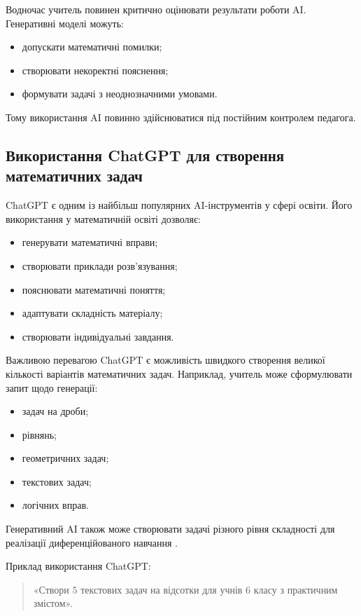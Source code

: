 Водночас учитель повинен критично оцінювати результати роботи AI. Генеративні моделі можуть:
\begin{itemize}
\item допускати математичні помилки;
\item створювати некоректні пояснення;
\item формувати задачі з неоднозначними умовами.
\end{itemize}

Тому використання AI повинно здійснюватися під постійним контролем педагога.

\subsection{Використання ChatGPT для створення математичних задач}

ChatGPT є одним із найбільш популярних AI-інструментів у сфері освіти. Його використання у математичній освіті дозволяє:
\begin{itemize}
\item генерувати математичні вправи;
\item створювати приклади розв’язування;
\item пояснювати математичні поняття;
\item адаптувати складність матеріалу;
\item створювати індивідуальні завдання.
\end{itemize}

Важливою перевагою ChatGPT є можливість швидкого створення великої кількості варіантів математичних задач. Наприклад, учитель може сформулювати запит щодо генерації:
\begin{itemize}
\item задач на дроби;
\item рівнянь;
\item геометричних задач;
\item текстових задач;
\item логічних вправ.
\end{itemize}

Генеративний AI також може створювати задачі різного рівня складності для реалізації диференційованого навчання \cite{Walkington2025}.

Приклад використання ChatGPT:
\begin{quote}
«Створи 5 текстових задач на відсотки для учнів 6 класу з практичним змістом».
\end{quote}

